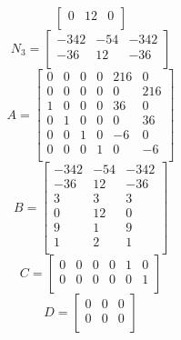 \begin{enumerate}
\begin{enumerate}
\begin{equation}
\begin{bmatrix}
          0 & 12 & 0 \\
        \end{bmatrix}
      \end{equation}
      \begin{equation}
        N_3 =
        \begin{bmatrix}
          -342 & -54 & -342 \\
          -36 & 12 & -36 \\
        \end{bmatrix}
      \end{equation}
      \begin{equation}
        A =
        \begin{bmatrix}
          0 & 0 & 0 & 0 & 216 & 0 \\
          0 & 0 & 0 & 0 & 0 & 216 \\
          1 & 0 & 0 & 0 & 36 & 0 \\
          0 & 1 & 0 & 0 & 0 & 36 \\
          0 & 0 & 1 & 0 & -6 & 0 \\
          0 & 0 & 0 & 1 & 0 & -6 \\
        \end{bmatrix}
      \end{equation}
      \begin{equation}
        B =
        \begin{bmatrix}
          -342 & -54 & -342 \\
          -36 & 12 & -36 \\
          3 & 3 & 3 \\
          0 & 12 & 0 \\
          9 & 1 & 9 \\
          1 & 2 & 1 \\
        \end{bmatrix}
      \end{equation}
      \begin{equation}
        C =
        \begin{bmatrix}
          0 & 0 & 0 & 0 & 1 & 0 \\
          0 & 0 & 0 & 0 & 0 & 1 \\
        \end{bmatrix}
      \end{equation}
      \begin{equation}
        D =
        \begin{bmatrix}
          0 & 0 & 0 \\
          0 & 0 & 0 \\

\end{bmatrix}
\end{equation}
\end{enumerate}
\end{enumerate}
